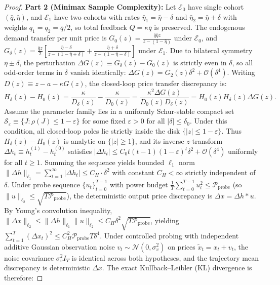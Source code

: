 \documentclass[12pt]{article}
\theoremstyle{definition}
\theoremstyle{remark}
\begin{document}
\begin{proof}
\textbf{Part 2 (Minimax Sample Complexity):} Let $\mathcal{E}_0$ have single cohort $(\bar{q}, \bar{\eta})$, and $\mathcal{E}_1$ have two cohorts with rates $\bar{\eta}_1 = \bar{\eta} - \delta$ and $\bar{\eta}_2 = \bar{\eta} + \delta$ with weights $q_1 = q_2 = \bar{q}/2$, so total feedback $Q = \kappa \bar{q}$ is preserved.
The endogenous demand transfer per unit price is $G_0(z) = \frac{\bar{q} \bar{\eta} z}{z - (1 - \bar{\eta})}$ under $\mathcal{E}_0$, and $G_\delta(z) = \frac{\bar{q} z}{2} [ \frac{\bar{\eta}-\delta}{z - (1 - \bar{\eta} + \delta)} + \frac{\bar{\eta}+\delta}{z - (1 - \bar{\eta} - \delta)} ]$ under $\mathcal{E}_1$. Due to bilateral symmetry $\bar{\eta} \pm \delta$, the perturbation $\Delta G(z) \equiv G_\delta(z) - G_0(z)$ is strictly even in $\delta$, so all odd-order terms in $\delta$ vanish identically: $\Delta G(z) = G_2(z) \delta^2 + \mathcal{O}(\delta^4)$.
Writing $D(z) \equiv z - a - \kappa G(z)$, the closed-loop price transfer discrepancy is:
\begin{equation}
H_\delta(z) - H_0(z) = \frac{\kappa}{D_\delta(z)} - \frac{\kappa}{D_0(z)} = \frac{\kappa^2 \Delta G(z)}{D_0(z) D_\delta(z)} = H_0(z) H_\delta(z) \Delta G(z).
\end{equation}
Assume the parameter family lies in a uniformly Schur-stable compact set $\mathcal{S}_\varepsilon \equiv \{J : \rho(J) \le 1 - \varepsilon\}$ for some fixed $\varepsilon > 0$ for all $|\delta| \le \delta_0$. Under this condition, all closed-loop poles lie strictly inside the disk $\{|z| \le 1 - \varepsilon\}$. Thus $H_\delta(z) - H_0(z)$ is analytic on $\{|z| \ge 1\}$, and its inverse $z$-transform $\Delta h_t \equiv h_t^{(1)} - h_t^{(0)}$ satisfies $|\Delta h_t| \le C_0 t(t-1) (1 - \varepsilon)^t \delta^2 + \mathcal{O}(\delta^4)$ uniformly for all $t \ge 1$.
Summing the sequence yields bounded $\ell_1$ norm $\|\Delta h\|_{\ell_1} = \sum_{t=1}^\infty |\Delta h_t| \le C_H \cdot \delta^2$ with constant $C_H < \infty$ strictly independent of $\delta$. Under probe sequence $\{u_t\}_{t=0}^{T-1}$ with power budget $\frac{1}{T} \sum_{t=0}^{T-1} u_t^2 \le \mathcal{P}_{\text{probe}}$ (so $\|u\|_{\ell_2} \le \sqrt{T \mathcal{P}_{\text{probe}}}$), the deterministic output price discrepancy is $\Delta x = \Delta h * u$.
By Young's convolution inequality, $\|\Delta x\|_{\ell_2} \le \|\Delta h\|_{\ell_1} \|u\|_{\ell_2} \le C_H \delta^2 \sqrt{T \mathcal{P}_{\text{probe}}}$, yielding $\sum_{t=1}^T (\Delta x_t)^2 \le C_H^2 \mathcal{P}_{\text{probe}} T \delta^4$.
Under controlled probing with independent additive Gaussian observation noise $v_t \sim \mathcal{N}(0, \sigma_v^2)$ on prices $\tilde{x}_t = x_t + v_t$, the noise covariance $\sigma_v^2 I_T$ is identical across both hypotheses, and the trajectory mean discrepancy is deterministic $\Delta x$. The exact Kullback--Leibler (KL) divergence is therefore:

\end{proof}
\end{document}
